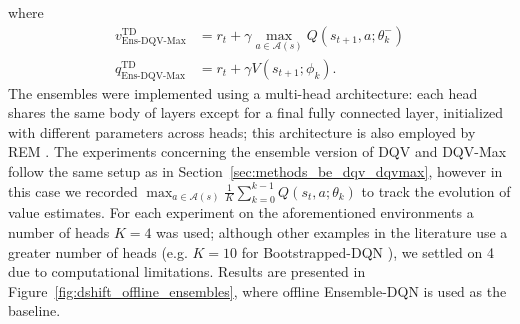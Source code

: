 where
\begin{align}
  v^{\scriptscriptstyle
  \textrm{TD}}_{\scriptscriptstyle\textrm{Ens-DQV-Max}}&=r_t+\gamma\max_{a\in\mathcal{A}\left(s\right)}Q\left(s_{t+1},a;\theta_k^{-}\right)\\
  q^{\scriptscriptstyle\textrm{TD}}_{\scriptscriptstyle\textrm{Ens-DQV-Max}}&=r_t+\gamma V\left(s_{t+1};\phi_k\right).
\end{align}
The ensembles were implemented using a multi-head architecture: each
head shares the same body of layers except for a final
fully connected layer, initialized with different parameters across
heads; this architecture is also employed by REM
\citep{agarwal2020optimistic}.
The experiments concerning the ensemble version of DQV and DQV-Max
follow the same setup as in Section~\ref{sec:methods_be_dqv_dqvmax},
however in this case we recorded
$\max_{a\in\mathcal{A}\left(s\right)}\frac{1}{K}\sum_{k=0}^{k-1}Q\left(s_t,a;\theta_k\right)$
to track the evolution of value estimates.
For each experiment on the aforementioned environments a number of
heads $K=4$ was used; although other examples in the literature use a
greater number of heads (e.g. $K=10$ for Bootstrapped-DQN
\citep{osband2016deep}), we settled on 4 due to computational
limitations. Results are presented in
Figure~\ref{fig:dshift_offline_ensembles}, where offline Ensemble-DQN
is used as the baseline.
